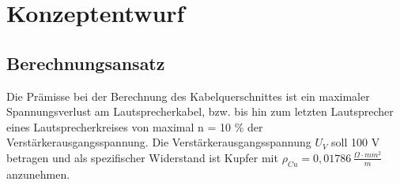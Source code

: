 \chapter{Konzeptentwurf}
\label{cha:Konzeptentwurf}

\section{Berechnungsansatz}
\label{sec:Berechnungsansatz}
Die Prämisse bei der Berechnung des Kabelquerschnittes ist ein maximaler Spannungsverlust am Lautsprecherkabel, bzw. bis hin zum letzten Lautsprecher eines Lautsprecherkreises von maximal n = 10 \% der Verstärkerausgangsspannung. Die Verstärkerausgangsspannung $U_V$ soll 100 V betragen und als spezifischer Widerstand ist Kupfer mit $\rho_{Cu} = 0,01786\,\frac{\Omega\cdot mm^2}{m}$ anzunehmen.

